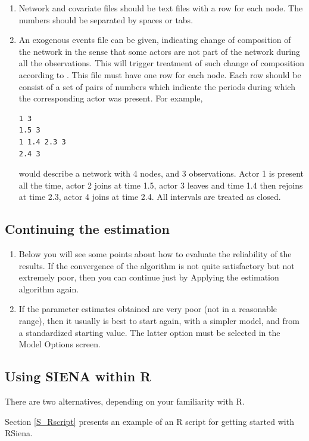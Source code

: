 \documentclass[a4paper,fleqn]{article}
\newcommand{\+}{\, + \,}
\newcommand{\R}{{\sf R }}
\newcommand{\Rn}{{\sf R}}
\newcommand{\rs}{{\sf RSiena}}
\newcommand{\SI}{{\sf SIENA }}
\begin{document}
{\begin{enumerate}
\item
Network and covariate files should be text files with a row for each node. The
numbers should be separated by spaces or tabs.
\item
An exogenous events file can be given, indicating change of composition of the
network in the sense that some actors are not part of the network during
all the observations.
This will trigger treatment of such change of composition
according to \citet{HuismanSnijders03}.
This file must have one row for each node.
Each row should be
consist of a set of pairs of numbers which indicate the periods
during which the corresponding actor
was present. For example,
\begin{verbatim}
1 3
1.5 3
1 1.4 2.3 3
2.4 3
\end{verbatim}
would describe a network with 4 nodes, and 3 observations. Actor 1 is present
all the time, actor 2 joins at time 1.5, actor 3 leaves and time 1.4 then
rejoins at time 2.3, actor 4 joins at time 2.4. All intervals are treated as
closed.
\end{enumerate}
\subsection{Continuing the estimation}
\begin{enumerate}
\item Below you will see some points about how to evaluate the reliability of
  the results.  If the convergence of the algorithm is not quite satisfactory
  but not extremely poor, then you can continue just by \textsf{Apply}ing the
  estimation algorithm again.
\item If the parameter estimates obtained are very poor (not in a reasonable
  range), then it usually is best to start again, with a simpler model, and from
  a standardized starting value.  The latter option must be selected in the
  \textsf{Model Options} screen.
\end{enumerate}
\bigskip

\subsection{Using \SI within \Rn}
\label{S_SR}

There are two alternatives, depending on your familiarity with \Rn.

Section \ref{S_Rscript} presents an example of an \R script
for getting started with \rs.

}
\end{document}
